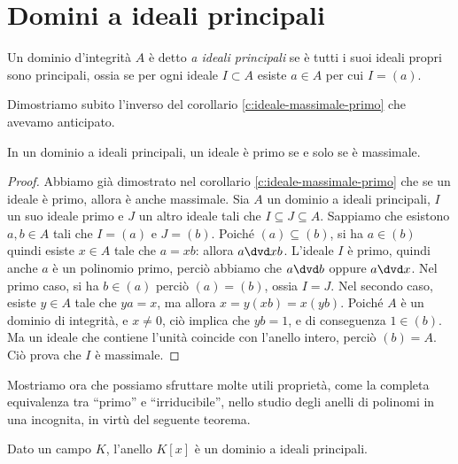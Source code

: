 \section{Domini a ideali principali}
\begin{definizione} \label{d:dominio-ideali-principali}
	Un dominio d'integrità $A$ è detto \emph{a ideali principali} se è tutti i suoi ideali propri sono principali, ossia se per ogni ideale $I\subset A$ esiste $a\in A$ per cui $I=(a)$.
\end{definizione}
Dimostriamo subito l'inverso del corollario \ref{c:ideale-massimale-primo} che avevamo anticipato.
\begin{teorema} \label{t:ideale-massimale-primo}
	In un dominio a ideali principali, un ideale è primo se e solo se è massimale.
\end{teorema}
\begin{proof}
	Abbiamo già dimostrato nel corollario \ref{c:ideale-massimale-primo} che se un ideale è primo, allora è anche massimale.
	Sia $A$ un dominio a ideali principali, $I$ un suo ideale primo e $J$ un altro ideale tali che $I\subseteq J\subseteq A$.
	Sappiamo che esistono $a,b\in A$ tali che $I=(a)$ e $J=(b)$.
	Poich\'e $(a)\subseteq(b)$, si ha $a\in(b)$ quindi esiste $x\in A$ tale che $a=xb$: allora $a\dvd xb$.
	L'ideale $I$ è primo, quindi anche $a$ è un polinomio primo, perciò abbiamo che $a\dvd b$ oppure $a\dvd x$.
	Nel primo caso, si ha $b\in(a)$ perciò $(a)=(b)$, ossia $I=J$.
	Nel secondo caso, esiste $y\in A$ tale che $ya=x$, ma allora $x=y(xb)=x(yb)$.
	Poich\'e $A$ è un dominio di integrità, e $x\ne 0$, ciò implica che $yb=1$, e di conseguenza $1\in(b)$.
	Ma un ideale che contiene l'unità coincide con l'anello intero, perciò $(b)=A$.
	Ciò prova che $I$ è massimale.
\end{proof}
Mostriamo ora che possiamo sfruttare molte utili proprietà, come la completa equivalenza tra ``primo'' e ``irriducibile'', nello studio degli anelli di polinomi in una incognita, in virtù del seguente teorema.
\begin{teorema}
	Dato un campo $K$, l'anello $K[x]$ è un dominio a ideali principali.
\end{teorema}
